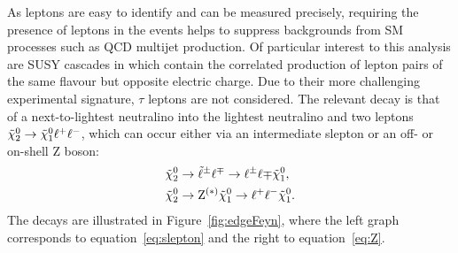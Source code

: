 As leptons are easy to identify and can be measured precisely, requiring the presence of leptons in the events helps to suppress backgrounds from SM processes such as QCD multijet production. Of particular interest to this analysis are SUSY cascades in which contain the correlated production of lepton pairs of the same flavour but opposite electric charge. Due to their more challenging experimental signature, $\tau$ leptons are not considered. The relevant decay is that of a next-to-lightest neutralino into the lightest neutralino and two leptons ${\tilde{\chi}^0_2} \rightarrow {\tilde{\chi}^0_1} \ell^+\ell^-$, which can occur either via an intermediate slepton or an off- or on-shell Z boson:
\begin{align}
{\tilde{\chi}^0_2} &\rightarrow \tilde{\ell}^{\pm}\ell^{\mp} \rightarrow \ell^{\pm}\ell{\mp}{\tilde{\chi}^0_1},\label{eq:slepton}\\ 
{\tilde{\chi}^0_2} &\rightarrow \mathrm{Z}^{(*)}{\tilde{\chi}^0_1} \rightarrow \ell^+\ell^-{\tilde{\chi}^0_1}.\label{eq:Z}
\end{align}
The decays are illustrated in Figure~\ref{fig:edgeFeyn}, where the left graph corresponds to equation~\ref{eq:slepton} and the right to equation~\ref{eq:Z}.
